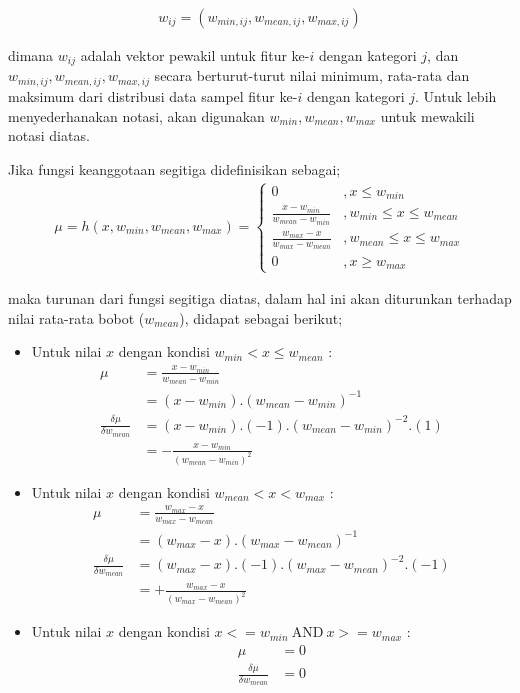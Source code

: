 \begin{align}
\label{eq:trimbobot}
	w_{ij} = (w_{min,ij}, w_{mean,ij}, w_{max,ij})
\end{align}

\noindent dimana $w_{ij}$ adalah vektor pewakil untuk fitur ke-$i$ dengan
kategori $j$, dan $w_{min,ij}, w_{mean,ij}, w_{max,ij}$ secara
berturut-turut nilai minimum, rata-rata dan maksimum dari distribusi data sampel
fitur ke-$i$ dengan kategori $j$. Untuk lebih menyederhanakan notasi, akan
digunakan $w_{min}, w_{mean}, w_{max}$ untuk mewakili notasi diatas.

\noindent Jika fungsi keanggotaan segitiga didefinisikan sebagai;
\begin{align}
\label{eq:trim}
	\mu = h(x, w_{min}, w_{mean}, w_{max}) = \left\{ 
	\begin{array}{ll}
	0 & , x \leq w_{min}\\
	\frac{x - w_{min}}{w_{mean} - w_{min}} & , w_{min} \leq x \leq w_{mean} \\
	\frac{w_{max} - x}{w_{max} - w_{mean}} & , w_{mean} \leq x \leq w_{max} \\
	0 & , x \geq w_{max}
	\end{array}
\end{align}

\noindent maka turunan dari fungsi segitiga diatas, dalam hal ini akan
diturunkan terhadap nilai rata-rata bobot ($w_{mean}$), didapat sebagai berikut;
\begin{itemize}
  \item Untuk nilai $x$ dengan kondisi $w_{min} < x \leq w_{mean}$ :
  \begin{align}
	\label{eq:trim1}
		\mu &= \frac{x - w_{min}}{w_{mean} - w_{min}} \nonumber \\
			&= (x - w_{min}) . (w_{mean} - w_{min})^{-1} \nonumber \\
		\frac{\delta \mu}{\delta w_{mean}} &=
		(x - w_{min}).(-1).(w_{mean} - w_{min})^{-2}.(1) \nonumber \\
		 &=
		- \frac{x - w_{min}}{(w_{mean} - w_{min})^2}
	\end{align}

	\item Untuk nilai $x$ dengan kondisi  $w_{mean} < x < w_{max}$ :
	\begin{align}
	\label{eq:trim2}
		\mu &= \frac{w_{max} - x}{w_{max} - w_{mean}} \nonumber \\
			&= (w_{max} - x) . (w_{max} - w_{mean})^{-1} \nonumber \\
		\frac{\delta \mu}{\delta w_{mean}} &=
		(w_{max} - x).(-1).(w_{max} - w_{mean})^{-2}.(-1) \nonumber \\
		 &=
		+ \frac{w_{max} - x}{(w_{max} - w_{mean})^2}
	\end{align}
	
	\item Untuk nilai $x$ dengan kondisi $x <= w_{min}\ \text{AND}\ x >= w_{max}$ :
	\begin{align}
	\label{eq:trim3}
		\mu &= 0 \nonumber \\
		\frac{\delta \mu}{\delta w_{mean}} &= 0
	\end{align}
\end{itemize}

